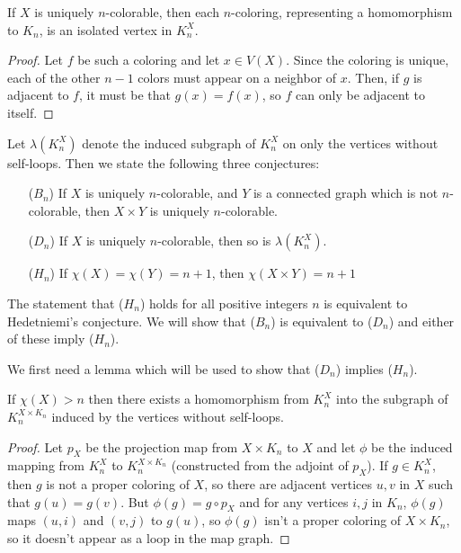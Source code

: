 \begin{theorem}
	If $X$ is uniquely $n$-colorable, then each $n$-coloring, representing a homomorphism to $K_n$, is an isolated vertex in $K_n^X$.
\end{theorem}
\begin{proof}
	Let $f$ be such a coloring and let $x\in V(X)$.  Since the coloring is unique, each of the other $n-1$ colors must appear on a neighbor of $x$.  Then, if $g$ is adjacent to $f$, it must be that $g(x)=f(x)$, so $f$ can only be adjacent to itself.
\end{proof}

Let $\lambda(K_n^X)$ denote the induced subgraph of $K_n^X$ on only the vertices without self-loops.  Then we state the following three conjectures:

\begin{enumerate}
	\item[($B_n$)] If $X$ is uniquely $n$-colorable, and $Y$ is a connected graph which is not $n$-colorable, then $X\times Y$ is uniquely $n$-colorable.
	\item[($D_n$)] If $X$ is uniquely $n$-colorable, then so is $\lambda(K^X_n)$.
	\item[($H_n$)] If $\chi(X)=\chi(Y)=n+1$, then $\chi(X\times Y)=n+1$  
\end{enumerate}

\begin{claim}
The statement that ($H_n$) holds for all positive integers $n$ is equivalent to Hedetniemi's conjecture.  We will show that ($B_n$) is equivalent to ($D_n$) and either of these imply ($H_n$).
\end{claim}

We first need a lemma which will be used to show that ($D_n$) implies ($H_n$).

\begin{lemma}
	If $\chi(X)>n$ then there exists a homomorphism from $K^X_n$ into the subgraph of $K_n^{X\times K_n}$ induced by the vertices without self-loops.
\end{lemma}
\begin{proof}
	Let $p_X$ be the projection map from $X\times K_n$ to $X$ and let $\phi$ be the induced mapping from $K^X_n$ to $K_n^{X\times K_n}$ (constructed from the adjoint of $p_X$).  If $g\in K^X_n$, then $g$ is not a proper coloring of $X$, so there are adjacent vertices $u,v$ in $X$ such that $g(u)=g(v)$.  But $\phi(g) = g\circ p_X$ and for any vertices $i,j$ in $K_n$, $\phi(g)$ maps $(u,i)$ and $(v,j)$ to $g(u)$, so $\phi(g)$ isn't a proper coloring of $X\times K_n$, so it doesn't appear as a loop in the map graph.
\end{proof}

